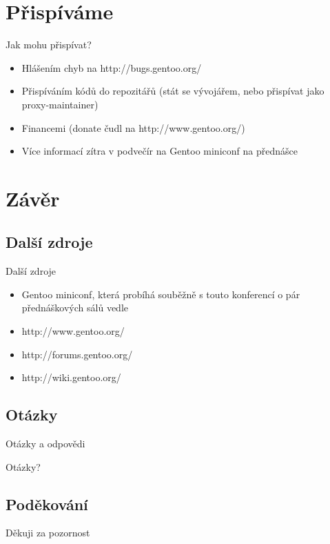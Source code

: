 \documentclass{beamer}
\begin{document}
\section{Přispíváme}
\begin{frame}{Jak mohu přispívat?}
	\begin{itemize}
		\item Hlášením chyb na http://bugs.gentoo.org/
		\item Přispíváním kódů do repozitářů (stát se vývojářem, nebo přispívat jako proxy-maintainer)
		\item Financemi (donate čudl na http://www.gentoo.org/)
		\item Více informací zítra v podvečír na Gentoo miniconf na přednášce 
	\end{itemize}
\end{frame}

\section{Závěr}

\subsection{Další zdroje}
\begin{frame}{Další zdroje}
	\begin{itemize}
		\item Gentoo miniconf, která probíhá souběžně s touto konferencí o pár přednáškových sálů vedle
		\item http://www.gentoo.org/
		\item http://forums.gentoo.org/
		\item http://wiki.gentoo.org/
	\end{itemize}
\end{frame}

\subsection{Otázky}
\begin{frame}{Otázky a odpovědi}
	\begin{center}Otázky?\end{center}
\end{frame}

\subsection{Poděkování}
\begin{frame}{}
	\begin{center}Děkuji za pozornost\end{center}
\end{frame}
\end{document}
